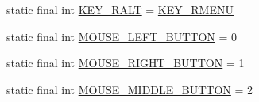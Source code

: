 \begin{DoxyCompactItemize}
\item 
static final int \mbox{\hyperlink{classorg_1_1newdawn_1_1slick_1_1_input_ac0e3bc8418ab2a164468408d19813b4c}{K\+E\+Y\+\_\+\+R\+A\+LT}} = \mbox{\hyperlink{classorg_1_1newdawn_1_1slick_1_1_input_acf842a77f8ed94b795d68764c848d631}{K\+E\+Y\+\_\+\+R\+M\+E\+NU}}
\item 
static final int \mbox{\hyperlink{classorg_1_1newdawn_1_1slick_1_1_input_a77f684cc21b29140078854972d1fdeae}{M\+O\+U\+S\+E\+\_\+\+L\+E\+F\+T\+\_\+\+B\+U\+T\+T\+ON}} = 0
\item 
static final int \mbox{\hyperlink{classorg_1_1newdawn_1_1slick_1_1_input_a6fc82cbfcde5bb8c9c3574bdceb241d2}{M\+O\+U\+S\+E\+\_\+\+R\+I\+G\+H\+T\+\_\+\+B\+U\+T\+T\+ON}} = 1
\item 
static final int \mbox{\hyperlink{classorg_1_1newdawn_1_1slick_1_1_input_a82c1629e1641ca3d0858bacb94545591}{M\+O\+U\+S\+E\+\_\+\+M\+I\+D\+D\+L\+E\+\_\+\+B\+U\+T\+T\+ON}} = 2
\end{DoxyCompactItemize}
